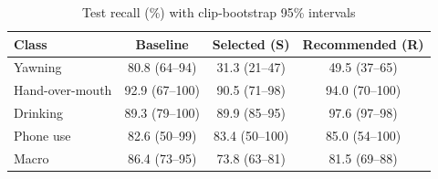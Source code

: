 \begin{table}[t]
\caption{Test recall (\%) with clip-bootstrap 95\% intervals}
\label{tab:uncertainty}
\centering
\footnotesize
\setlength{\tabcolsep}{2.5pt}
\begin{tabular}{@{}lccc@{}}
\toprule
\textbf{Class} & \textbf{Baseline} & \textbf{Selected (S)} & \textbf{Recommended (R)} \\
\midrule
Yawning & 80.8 (64--94) & 31.3 (21--47) & 49.5 (37--65) \\
Hand-over-mouth & 92.9 (67--100) & 90.5 (71--98) & 94.0 (70--100) \\
Drinking & 89.3 (79--100) & 89.9 (85--95) & 97.6 (97--98) \\
Phone use & 82.6 (50--99) & 83.4 (50--100) & 85.0 (54--100) \\
\midrule
Macro & 86.4 (73--95) & 73.8 (63--81) & 81.5 (69--88) \\
\bottomrule
\end{tabular}
\end{table}
